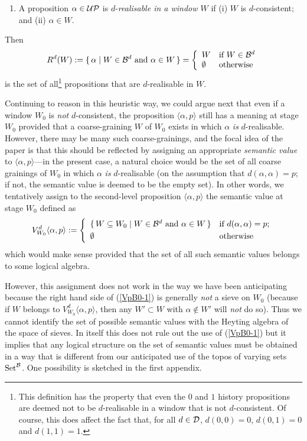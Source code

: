 \documentclass[12pt]{article}
\newcounter{def-number}[section]
\newcounter{defn}
\newenvironment{defn}{\medskip\noindent\stepcounter{def-number}
\nopagebreak[4]{\em Definition \arabic{section}.\arabic{def-number}}
\begin{enumerate}\setlength{\topsep}{-0pt}}%
{\end{enumerate}}
\newcommand{\ba}{\begin{array}}
\newcommand{\ea}{\end{array}}
\newcommand{\beq}{\begin{equation}}
\newcommand{\eeq}{\end{equation}}
\newcommand{\aand}{\mbox{ and }}
\newcommand{\eq}[1]{(\ref{#1})}
\renewcommand{\a}{\alpha}                   %
\newcommand{\gp}[2]{\langle#1,#2\rangle}
\newcommand{\Bd}{{\cal B}^d}
\newcommand{\D}{{\cal D}}
\newcommand{\UP}{{\cal UP}}
\newcommand{\Set}{{\rm Set}}
\newcommand{\SetB}{{\Set^{\cal B}}}
\begin{document}
\begin{defn}
\item[] A proposition $\a\in\UP$ is $d$-{\em realisable in a
window $W$\/} if (i) $W$ is $d$-consistent; and (ii) $\a\in W$.
\end{defn}
\noindent
Then
\beq
		R^d(W):=\{\,\a\mid W\in\Bd\aand\a\in W\,\}=
						\left\{\ba{ll}
								W&\mbox{if $W\in \Bd$}\\
								\emptyset &\mbox{otherwise}
							\ea
						\right.	\label{Def:RdW}
\eeq
is the set of all\footnote{This definition has the property that
even the $0$ and $1$ history propositions are deemed not to be
$d$-realisable in a window that is not $d$-consistent. Of course,
this does affect the fact that, for all $d\in\D$, $d(0,0)=0$,
$d(0,1)=0$ and $d(1,1)=1$.} propositions that are $d$-realisable in
$W$.


	Continuing to reason in this heuristic way, we could argue next
that even if a window $W_0$ is {\em not\/} $d$-consistent, the
proposition $\gp{\a}{p}$ still has a meaning at stage $W_0$ provided
that a coarse-graining $W$ of $W_0$ exists in which $\a$ {\em is\/}
$d$-realisable. However, there may be many such coarse-grainings,
and the focal idea of the paper is that this should be reflected
by assigning an appropriate {\em semantic value\/} to
$\gp{\a}{p}$---in the present case, a natural choice would be the set of
all coarse grainings of $W_0$ in which $\a$ {\em is\/} $d$-realisable (on
the assumption that $d(\a,\a)=p$; if not, the semantic value is
deemed to be the empty set). In other words, we tentatively assign
to the second-level proposition $\gp{\a}{p}$ the semantic value at
stage $W_0$ defined as
\beq
	V^d_{W_0}\gp{\a}p:=\left\{\ba{ll}
		\{\,W\subseteq W_0\mid W\in\Bd \aand \a\in W\,\}
				&\mbox{if $d(\a,\a)=p$};\\[3pt]
			\emptyset&\mbox{otherwise}
						\ea
						\right.				\label{VpB0-1}
\eeq
which would make sense provided that the set of all such semantic
values belongs to some logical algebra.

	However, this assignment does not work in the way we have been
anticipating because the right hand side of \eq{VpB0-1} is generally
{\em not\/} a sieve on $W_0$ (because if $W$ belongs to
$V^d_{W_0}\gp{\a}p$, then any $W'\subset W$ with $\a\not\in W'$ will
{\em not\/} do so). Thus we cannot identify the set of possible
semantic values with the Heyting algebra of the space of sieves.  In
itself this does not rule out the use of \eq{VpB0-1} but it implies
that any logical structure on the set of semantic values
must be obtained in a way that is different from our anticipated use
of the topos of varying sets $\SetB$.  One possibility is sketched
in the first appendix.
\end{document}
